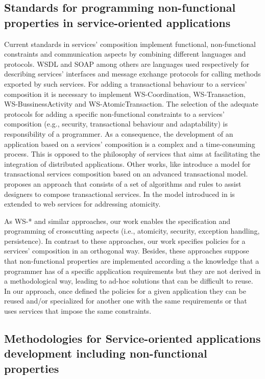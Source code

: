 \subsection{Standards for programming non-func\-tion\-al properties in service-oriented applications}

Current standards in services' composition implement functional, non-functional constraints and communication aspects by combining different languages and protocols. WSDL and SOAP among others are languages used respectively for describing services' interfaces and message exchange protocols for calling methods exported by such services. For adding a transactional behaviour to a services' composition it is necessary to implement WS-Coordination, WS-Transaction, WS-BussinessActivity and WS-AtomicTransaction. The selection of the adequate protocols for adding a specific non-functional constraints to a services' composition (e.g., security, transactional behaviour and adaptability) is responsibility of a programmer. As a consequence, the development of an application based on a services' composition is a complex and a time-consuming process. This is opposed to the philosophy of services that aims at facilitating the integration of distributed applications. Other works, like \cite{Fauvet05} introduce a model for transactional services composition based on an advanced transactional model.\cite{BhiriGP05} proposes an approach that consists of a set of algorithms and rules to assist designers to compose transactional services. In \cite{Vidyasankar:2004} the model introduced in \cite{SchuldtABS02} is extended to web services for addressing atomicity.

As WS-* and similar approaches, our work enables the specification and programming of crosscutting aspects (i.e., atomicity, security, exception handling, persistence).
In contrast to these approaches, our work specifies policies for a services' composition in an orthogonal way. Besides, these approaches suppose that non-functional properties are implemented according a the knowledge that a programmer has of a specific application requirements but they are not derived in a methodological way, leading to ad-hoc solutions that can be difficult to reuse. In our approach, once defined the policies for a given application they can be reused and/or specialized for another one with the same requirements or that uses services that impose the same constraints.

\subsection{Methodologies for Service-oriented applications development including non-func\-tion\-al properties}

